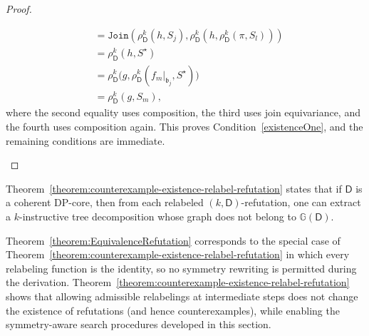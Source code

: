 \documentclass[11pt,a4paper]{article}
\newcommand{\treewidthvalue}{k}
\newcommand{\abag}{\mathfrak{b}}
\newcommand{\jointype}{\mathtt{Join}}
\newcommand{\dpcoregraphproperty}[1]{\mathbb{G}(#1)}
\newcommand{\dpcore}{\mathsf{D}}
\newcommand{\witnessset}{S}
\newcommand{\relabelingfunction}{f}
\newcommand{\action}{\rho}
\begin{document}
\begin{proof}
\begin{enumerate}
\[\begin{aligned}
&= \jointype(\action_{\dpcore}^{\treewidthvalue}(h,\witnessset_j),\action_{\dpcore}^{\treewidthvalue}(h,\action_{\dpcore}^{\treewidthvalue}(\pi,\witnessset_l)))\\
&= \action_{\dpcore}^{\treewidthvalue}(h,S^\star)\\
&= \action_{\dpcore}^{\treewidthvalue}\bigl(g,\action_{\dpcore}^{\treewidthvalue}(\relabelingfunction_m|_{\abag_j},S^\star)\bigr)\\
&= \action_{\dpcore}^{\treewidthvalue}(g,\witnessset_m),
\end{aligned}
\]
where the second equality uses composition, the third uses join equivariance, and the fourth uses composition again. This proves Condition~\ref{existenceOne}, and the remaining conditions are immediate.
\end{enumerate}
\end{proof}


Theorem~\ref{theorem:counterexample-existence-relabel-refutation} states that if $\dpcore$ is a coherent DP-core, then from each relabeled $(\treewidthvalue,\dpcore)$-refutation, one can extract a $\treewidthvalue$-instructive tree decomposition whose graph does not belong to $\dpcoregraphproperty{\dpcore}$.

Theorem~\ref{theorem:EquivalenceRefutation} corresponds to the special case of Theorem~\ref{theorem:counterexample-existence-relabel-refutation} in which every relabeling function is the identity, so no symmetry rewriting is permitted during the derivation. Theorem~\ref{theorem:counterexample-existence-relabel-refutation} shows that allowing admissible relabelings at intermediate steps does not change the existence of refutations (and hence counterexamples), while enabling the symmetry-aware search procedures developed in this section.
\end{document}
